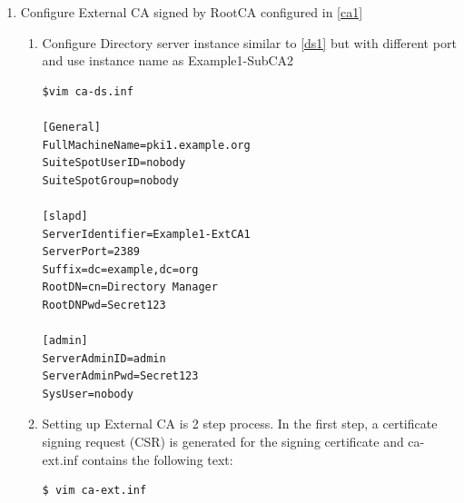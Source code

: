 \documentclass[a4paper]{article}
\begin{document}
\begin{enumerate}[label*=\arabic*.]
\begin{enumerate}[label*=\arabic*.]
\begin{lstlisting}
[Tomcat]
pki_ajp_port=18009
pki_tomcat_server_port=18005

[CA]
pki_subordinate=True
pki_issuing_ca=https://pki1.example.org:8443
pki_ca_signing_subject_dn=cn=CA Subordinate Signing,o=example.org
pki_ds_hostname=pki1.example.org
pki_ds_ldap_port=1389
pki_ds_password=Secret123
pki_ds_secure_connection=False
                    \end{lstlisting}
                \item  Run pkispawn with above configuration to configure SubCA.
                    \begin{lstlisting}[style=bashInputStyle]
$ pkispawn -s CA -f subca1.inf -vv
                    \end{lstlisting}
                \item Verify Subsystem status using systemctl and pkidaemon commands
                    \begin{lstlisting}[style=bashInputStyle]
$ systemctl status pki-tomcatd@Example-SubCA1
$ pkidaemon status tomcat Example1-SubCA1
                    \end{lstlisting}
                \end{enumerate}
            \item \label{ca3} Configure External CA signed by RootCA configured in \ref{ca1}
                \begin{enumerate}[label*=\arabic*.]
                    \item Configure Directory server instance similar to \ref{ds1} but with different port and use instance name as Example1-SubCA2
                        \begin{lstlisting}
$vim ca-ds.inf

[General]
FullMachineName=pki1.example.org 
SuiteSpotUserID=nobody
SuiteSpotGroup=nobody

[slapd]
ServerIdentifier=Example1-ExtCA1
ServerPort=2389
Suffix=dc=example,dc=org
RootDN=cn=Directory Manager
RootDNPwd=Secret123

[admin]
ServerAdminID=admin
ServerAdminPwd=Secret123
SysUser=nobody
                        \end{lstlisting}            
                    \item \label{ca3.1} Setting up External CA is 2 step process.  In the first step, a certificate signing request (CSR) 
                    is generated for the signing certificate and ca-ext.inf contains the following text:
                        \begin{lstlisting}
$ vim ca-ext.inf 


\end{lstlisting}
\end{enumerate}
\end{enumerate}
\end{document}
